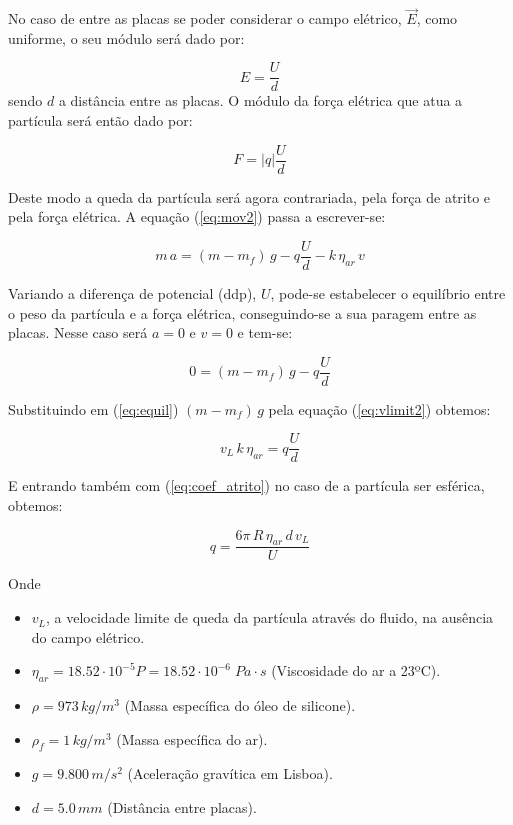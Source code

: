 \documentclass[a4paper,twoside,12pt]{article}      %
\begin{document}
No caso de entre as placas se poder considerar o campo elétrico, $\vec{E}$, como uniforme, o seu módulo será dado por:


\begin{equation*}
	E = \frac{U}{d}
\end{equation*}
sendo $d$ a distância entre as placas. O módulo da força elétrica que atua a partícula será então  dado por: 

\begin{equation*}
	F = |q| \frac{U}{d}
\end{equation*}

Deste modo a queda da partícula será agora contrariada, pela força de atrito e pela força elétrica. A equação (\ref{eq:mov2}) passa a escrever-se:

\begin{equation}
	\label{eq:mov3}
	m\,a = (m - m_f)\,g  - q \frac{U}{d} - k  \, \eta_{ar} \, v
\end{equation}

Variando a diferença de potencial (ddp), $U$, pode-se estabelecer o equilíbrio entre o peso da partícula e a força elétrica, conseguindo-se a sua paragem entre as placas. Nesse caso será $a=0$ e $v=0$ e tem-se:

\begin{equation}
	\label{eq:equil}
	0 = (m - m_f)\,g  - q \frac{U}{d} 
\end{equation}

Substituindo em (\ref{eq:equil}) $(m - m_f)\,g$   pela equação (\ref{eq:vlimit2}) obtemos:

\begin{equation*}
	v_L\, k\, \eta_{ar} = q \frac{U}{d}
\end{equation*}

E entrando também com (\ref{eq:coef_atrito}) no caso de a partícula ser esférica, obtemos:

\begin{equation}
	\label{eq:carga}
	q = \frac{6 \pi \, R \, \eta_{ar} \, d\, v_L}{U}  
\end{equation}

Onde

\begin{itemize}
\item $v_L$, a velocidade limite de queda da partícula através do fluido, na ausência do campo elétrico. 
\item $\eta_{ar} = 18.52 \cdot 10^{-5} P =  18.52 \cdot 10^{-6} \; Pa\cdot s $ (Viscosidade do ar a 23ºC).
\item $\rho = 973 \, kg/m^{3}$ (Massa específica do óleo de silicone).
\item $\rho_f = 1 \, kg/m^{3}$ (Massa específica do ar).
\item $g=9.800\, m/s^{2}$ (Aceleração gravítica em Lisboa).
\item $d=5.0\, mm$ (Distância entre placas).
\end{itemize}
\end{document}
